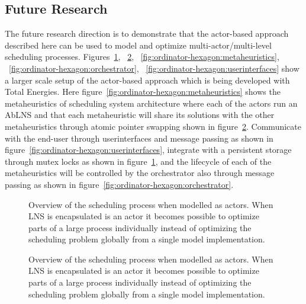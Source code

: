 \subsection{Future Research}\label{sec:discussion:future_research}
The future research direction is to demonstrate that
the actor-based approach described here can be used to model and optimize 
multi-actor/multi-level scheduling processes. 
Figures~\ref{fig:ordinator-hexagon:persistence},
~\ref{fig:ordinator-hexagon:atomicpointerswap},
~\ref{fig:ordinator-hexagon:metaheuristics},
~\ref{fig:ordinator-hexagon:orchestrator},
~\ref{fig:ordinator-hexagon:userinterfaces}
show a larger scale setup of the actor-based approach which is being developed with Total Energies.
Here figure~\ref{fig:ordinator-hexagon:metaheuristics}
shows the metaheuristics of scheduling system architecture where each of the actors run an AbLNS
and that each metaheuristic will share its solutions with the other
metaheuristics through atomic pointer swapping shown in figure~\ref{fig:ordinator-hexagon:atomicpointerswap}.
Communicate with the end-user
through userinterfaces and message passing as shown in figure~\ref{fig:ordinator-hexagon:userinterfaces}, 
integrate with a persistent storage through mutex
locks as shown in figure~\ref{fig:ordinator-hexagon:persistence}, 
and the lifecycle of each of the metaheuristics will be controlled by
the orchestrator also through message passing as shown in figure~\ref{fig:ordinator-hexagon:orchestrator}. 

% 	
\begin{figure}[H]
	\centering
	
	\resizebox{0.7\textwidth}{!}{
		\drawModelSetupHexagon[persistence=true]
	}
	\caption{
		Overview of the scheduling process when modelled as actors. When LNS is encapsulated 
		is an actor it becomes possible to optimize parts of a large process individually instead of 
		optimizing the scheduling problem globally from a single model implementation.
	}
	\label{fig:ordinator-hexagon:persistence}
\end{figure}
\begin{figure}[H]
	\centering
	
	\resizebox{0.7\textwidth}{!}{
		\drawModelSetupHexagon[atomicpointerswap=true]
	}
	\caption{
		Overview of the scheduling process when modelled as actors. When LNS is encapsulated 
		is an actor it becomes possible to optimize parts of a large process individually instead of 
		optimizing the scheduling problem globally from a single model implementation.
	}
	\label{fig:ordinator-hexagon:atomicpointerswap}
\end{figure}


